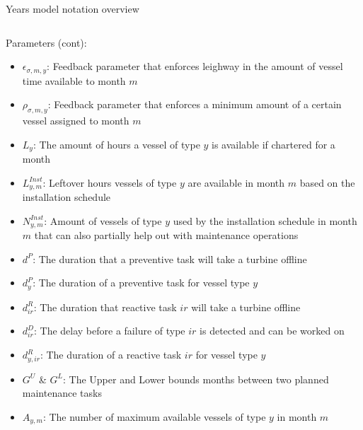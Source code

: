 \documentclass{beamer}
\begin{document}
\begin{frame}{Years model notation overview}
\begin{columns}
\begin{column}{.48\textwidth}
Parameters (cont):
\begin{itemize}
\item $\epsilon_{\sigma, m, y}$: Feedback parameter that enforces leighway in the amount of vessel time available to month $m$
\item $\rho_{ \sigma, m, y}$: Feedback parameter that enforces a minimum amount of a certain vessel assigned to month $m$
\item $L_y$: The amount of hours a vessel of type $y$ is available if chartered for a month
\item $L^{Inst}_{y,m}$: Leftover hours vessels of type $y$ are available in month $m$ based on the installation schedule
\item $N^{Inst}_{y,m}$: Amount of vessels of type $y$ used by the installation schedule in month $m$ that can also partially help out with maintenance operations
\item $d^P$: The duration that a preventive task will take a turbine offline
\item $d^P_y$: The duration of a preventive task for vessel type $y$
\item $d^R_{ir}$: The duration that reactive task $ir$ will take a turbine offline
\item $d^D_{ir}$: The delay before a failure of type $ir$ is detected and can be worked on
\item $d^R_{y,ir}$: The duration of a reactive task $ir$ for vessel type $y$
\item $G^U$ \& $G^L$: The Upper and Lower bounds months between two planned maintenance tasks
\item $A_{y,m}$: The number of maximum available vessels of type $y$ in month $m$
\end{itemize}
\end{column}
\end{columns}
\end{frame}

\end{document}
